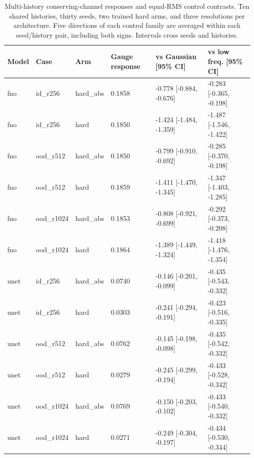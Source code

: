\begin{table}[H]
\centering
\small
\setlength{\tabcolsep}{3pt}
\begin{tabular}{llllll}
\toprule
Model & Case & Arm & Gauge response & vs Gaussian [95\% CI] & vs low freq. [95\% CI] \\\midrule
fno & id\_r256 & hard\_abs & 0.1858 & -0.778 [-0.884, -0.676] & -0.283 [-0.365, -0.198] \\
fno & id\_r256 & hard & 0.1850 & -1.424 [-1.484, -1.359] & -1.487 [-1.546, -1.422] \\
fno & ood\_r512 & hard\_abs & 0.1850 & -0.799 [-0.910, -0.692] & -0.285 [-0.370, -0.198] \\
fno & ood\_r512 & hard & 0.1859 & -1.411 [-1.470, -1.345] & -1.347 [-1.403, -1.285] \\
fno & ood\_r1024 & hard\_abs & 0.1853 & -0.808 [-0.921, -0.699] & -0.292 [-0.373, -0.208] \\
fno & ood\_r1024 & hard & 0.1864 & -1.389 [-1.449, -1.324] & -1.418 [-1.476, -1.354] \\
unet & id\_r256 & hard\_abs & 0.0740 & -0.146 [-0.201, -0.099] & -0.435 [-0.543, -0.332] \\
unet & id\_r256 & hard & 0.0303 & -0.241 [-0.294, -0.191] & -0.423 [-0.516, -0.335] \\
unet & ood\_r512 & hard\_abs & 0.0762 & -0.145 [-0.198, -0.098] & -0.435 [-0.542, -0.332] \\
unet & ood\_r512 & hard & 0.0279 & -0.245 [-0.299, -0.194] & -0.433 [-0.528, -0.342] \\
unet & ood\_r1024 & hard\_abs & 0.0769 & -0.150 [-0.203, -0.102] & -0.433 [-0.540, -0.332] \\
unet & ood\_r1024 & hard & 0.0271 & -0.249 [-0.304, -0.197] & -0.434 [-0.530, -0.344] \\
\bottomrule
\end{tabular}
\caption{Multi-history conserving-channel responses and equal-RMS control contrasts. Ten shared histories, thirty seeds, two trained hard arms, and three resolutions per architecture. Five directions of each control family are averaged within each seed/history pair, including both signs. Intervals cross seeds and histories.}
\label{tab:gauge-controls}
\end{table}
